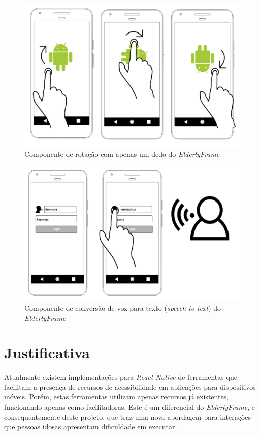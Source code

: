 \documentclass[
	12pt,				    %
	openright,			    %
	oneside,			    %
	a4paper,			    %
    sumario=tradicional,    %
	english,			    %
	brazil,				    %
	]{abntex2}              %
\begin{document}
\begin{figure}[H]
	\begin{center}
		\includegraphics[height=0.5\linewidth]{rotation.png}
	\end{center}
	\caption[Componente de Rotação com apenas um dedo]{Componente de rotação com apenas um dedo do \textit{ElderlyFrame}}
	\label{fig:rotation}
\end{figure}

\begin{figure}[H]
	\begin{center}
		\includegraphics[height=0.5\linewidth]{speech-to-text.png}
	\end{center}
	\caption[Speech To Text]{Componente de conversão de voz para texto (\textit{speech-to-text}) do \textit{ElderlyFrame}}
	\label{fig:speechToText}
\end{figure}

\chapter{Justificativa}\label{sec:justificativa}

Atualmente existem implementações para \textit{React Native} de ferramentas que facilitam a presença de recursos de acessibilidade em aplicações para dispositivos móveis. Porém, estas ferramentas utilizam apenas recursos já existentes, funcionando apenas como facilitadoras. Este é um diferencial do \textit{ElderlyFrame}, e consequentemente deste projeto, que traz uma nova abordagem para interações que pessoas idosas apresentam dificuldade em executar.
\end{document}
